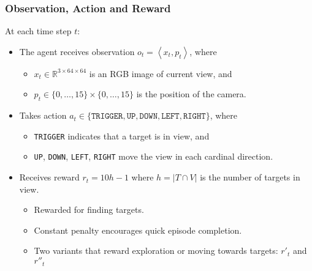 \begin{frame}
    \frametitle{Observation, Action and Reward}

    At each time step \(t\):

    \begin{itemize}
        \item The agent receives observation \(o_t = \left\langle x_t, p_t \right\rangle\), where
        \begin{itemize}
            \item \(x_t \in \mathbb{R}^{3 \times 64 \times 64}\) is an RGB image of current view, and
            \item \(p_t \in \{0, \dots, 15\} \times \{0, \dots, 15\}\) is the position of the camera.
        \end{itemize}
        \item Takes action \(a_t \in \{\texttt{TRIGGER}, \texttt{UP}, \texttt{DOWN}, \texttt{LEFT}, \texttt{RIGHT}\}\), where
        \begin{itemize}
            \item \texttt{TRIGGER} indicates that a target is in view, and
            \item \texttt{UP}, \texttt{DOWN}, \texttt{LEFT}, \texttt{RIGHT} move the view in each cardinal direction.
        \end{itemize}
        \item Receives reward \(r_t = 10h - 1\) where \(h = \left\vert T \cap V \right\vert\) is the number of targets in view.
        \begin{itemize}
            \item Rewarded for finding targets.
            \item Constant penalty encourages quick episode completion.
            \item Two variants that reward exploration or moving towards targets: \(r'_t\) and \(r''_t\)
        \end{itemize}
    \end{itemize}
\end{frame}

